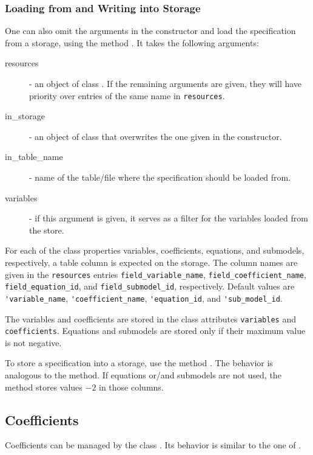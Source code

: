 {\subsubsection{Loading from and Writing into Storage}
%
One can also omit the arguments in the constructor and load the specification
from a storage, using the method . It takes the following
arguments:
\begin{description}
\item[resources] - an object of class . If the remaining
  arguments are given, they will have priority over entries of the same name
  in \verb|resources|.
\item[in_storage] -  an object of class  that overwrites the
  one given in the constructor.
\item[in_table_name] - name of the table/file where the specification should
  be loaded from.
\item[variables] - if this argument is given, it serves as a filter for the
  variables \variablesindex loaded from the store.
\end{description}
For each of the class properties variables, \variablesindex coefficients, \coefficientsindex equations, and
submodels, respectively, a table column is expected on the storage. The column
names are given in the \verb|resources| entries \verb|field_variable_name|,
\verb|field_coefficient_name|, \verb|field_equation_id|, and \verb|field_submodel_id|,
respectively. Default values are \verb|'variable_name|, \variablesindex \verb|'coefficient_name|, \coefficientsindex
\verb|'equation_id|, and \verb|'sub_model_id|.

The variables \variablesindex and coefficients \coefficientsindex are stored in the class attributes \attributesindex
\verb|variables| \variablesindex and \verb|coefficients|. \coefficientsindex Equations and submodels are stored
only if their maximum value is not negative.

To store a specification into a storage, use the method
. The behavior is
analogous to the  method. If equations or/and submodels are not
used, the method stores values $-2$ in those columns.


\subsection{Coefficients}
\coefficientsindex
\label{sec:coefficients}
%
Coefficients \coefficientsindex can be managed by the class . \coefficientsindex Its behavior
is similar to the one of .

}
